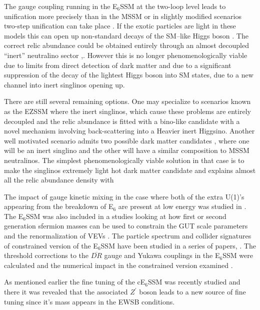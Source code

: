 \documentclass[preprint,amsmath,amssymb,aps,superscriptaddress,prd,showpacs,floatfix,nofootinbib]{revtex4-1}
\begin{document}
The gauge coupling running in the E$_6$SSM at the two-loop level leads
to unification more precisely than in the MSSM \cite{King:2007uj} or
in slightly modified scenarios two-step unification can take place
\cite{Howl:2007hq,Howl:2007zi}. If the exotic particles are light in
these models this can open up non-standard decays of the SM--like
Higgs boson \cite{Hall:2010ix,Nevzorov:2013tta,Athron:2014pua}. The
correct relic abundance could be obtained entirely through an almost
decoupled ``inert'' neutralino sector \cite{Hall:2009aj},.  However
this is no longer phenomenologically viable due to limits from direct
detection of dark matter
\cite{2011PhRvL.107m1302A,2012PhRvL.109r1301A, Akerib:2013tjd} and due
to a significant suppression of the decay of the lightest Higgs boson
into SM states, due to a new channel into inert singlinos opening up.

There are still several remaining options. One may specialize to
scenarios known as the EZSSM \cite{Hall:2011zq} where the inert
singlinos, which cause these problems are entirely decoupled and the
relic abundance is fitted with a bino-like candidate with a novel
mechanism involving back-scattering into a Heavier inert
Higgsino. Another well motivated scenario admits two possible dark
matter candidates \cite{Nevzorov:2012hs}, where one will be an inert
singlino and the other will have a similar composition to MSSM
neutralinos. The simplest phenomenologically viable solution in that
case is to make the singlinos extremely light hot dark matter
candidate and explains almost all the relic abundance density with

The impact of gauge kinetic mixing in the case where both of the extra
U(1)'s appearing from the breakdown of E$_6$ are present at low energy
was studied in \cite{Rizzo:2012rf}.  The E$_6$SSM was also included in
a studies looking at how first or second generation sfermion masses
can be used to constrain the GUT scale parameters \cite{Miller:2012vn}
and the renormalization of VEVs \cite{Sperling:2013eva,
  Sperling:2013xqa}.  The particle spectrum and collider signatures of
constrained version of the E$_6$SSM have been studied in a series of
papers,
\cite{Athron:2009ue,Athron:2009bs,Athron:2011wu,Athron:2012sq}. The
threshold corrections to the $\overline{DR}$ gauge and Yukawa
couplings in the E$_6$SSM were calculated and the numerical impact in
the constrained version examined \cite{Athron:2012pw}.

As mentioned earlier the fine tuning of the cE$_6$SSM was recently studied
\cite{Athron:2013ipa} and there it was revealed that the associated
$Z^\prime$ boson leads to a new source of fine tuning since it's mass
appears in the EWSB conditions.  
\end{document}
